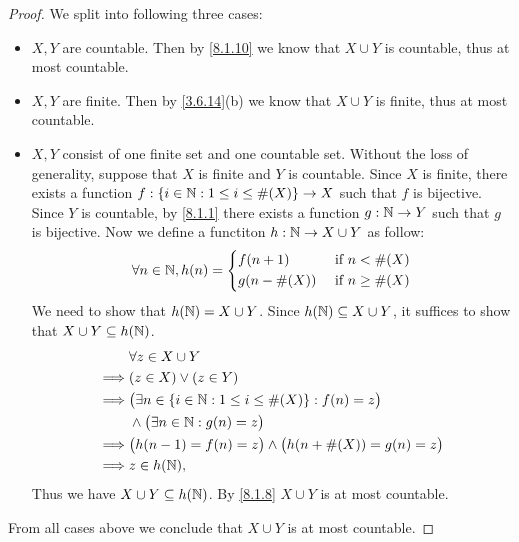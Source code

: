 \begin{proof}
  We split into following three cases:
  \begin{itemize}
    \item \(X, Y\) are countable.
          Then by \cref{8.1.10} we know that \(X \cup Y\) is countable, thus at most countable.
    \item \(X, Y\) are finite.
          Then by \cref{3.6.14}(b) we know that \(X \cup Y\) is finite, thus at most countable.
    \item \(X, Y\) consist of one finite set and one countable set.
          Without the loss of generality, suppose that \(X\) is finite and \(Y\) is countable.
          Since \(X\) is finite, there exists a function \(f : \left\lbrace i \in \mathbb{N} : 1 \leq i \leq \#(X)\right\rbrace \to X\) such that \(f\) is bijective.
          Since \(Y\) is countable, by \cref{8.1.1} there exists a function \(g : \mathbb{N} \to Y\) such that \(g\) is bijective.
          Now we define a functiton \(h : \mathbb{N} \to X \cup Y\) as follow:
          \[
            \forall n \in \mathbb{N}, h(n) = \begin{dcases}
              f(n + 1)     & \text{ if } n < \#(X)    \\
              g(n - \#(X)) & \text{ if } n \geq \#(X)
            \end{dcases}
          \]
          We need to show that \(h(\mathbb{N}) = X \cup Y\).
          Since \(h(\mathbb{N}) \subseteq X \cup Y\), it suffices to show that \(X \cup Y \subseteq h(\mathbb{N})\).
          \begin{align*}
                     & \forall z \in X \cup Y                                                  \\
            \implies & (z \in X) \lor (z \in Y)                                                \\
            \implies & \big(\exists n \in \left\lbrace i \in \mathbb{N} : 1 \leq i \leq \#(X)\right\rbrace : f(n) = z\big) \\
                     & \land \big(\exists n \in \mathbb{N} : g(n) = z\big)                             \\
            \implies & \big(h(n - 1) = f(n) = z\big) \land \big(h(n + \#(X)) = g(n) = z\big)   \\
            \implies & z \in h(\mathbb{N}),
          \end{align*}
          Thus we have \(X \cup Y \subseteq h(\mathbb{N})\).
          By \cref{8.1.8} \(X \cup Y\) is at most countable.
  \end{itemize}
  From all cases above we conclude that \(X \cup Y\) is at most countable.
\end{proof}


